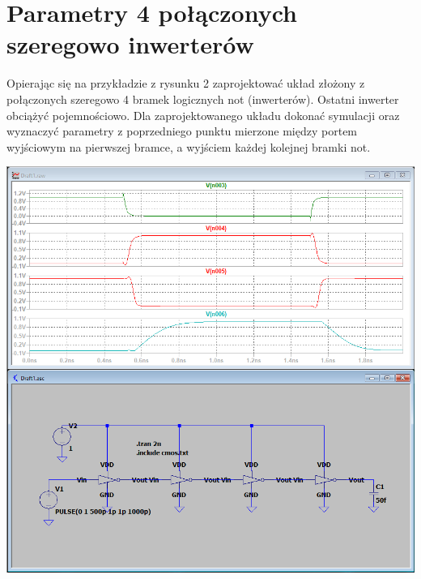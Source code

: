\documentclass[a4paper, 11pt]{article}
\begin{document}

\section{Parametry 4 połączonych szeregowo inwerterów}\label{sec: parametry_szeregowo} %

Opierając się na przykładzie z rysunku 2 zaprojektować układ złożony z połączonych szeregowo 4 bramek
logicznych not (inwerterów). Ostatni inwerter obciążyć pojemnościowo. Dla zaprojektowanego układu dokonać symulacji
oraz wyznaczyć parametry z poprzedniego punktu mierzone między portem wyjściowym na pierwszej bramce, a wyjściem
każdej kolejnej bramki not.

\begin{center}
	\includegraphics[scale=0.35]{mikro_lab3/symulacja4.PNG}
\end{center}
\end{document}
